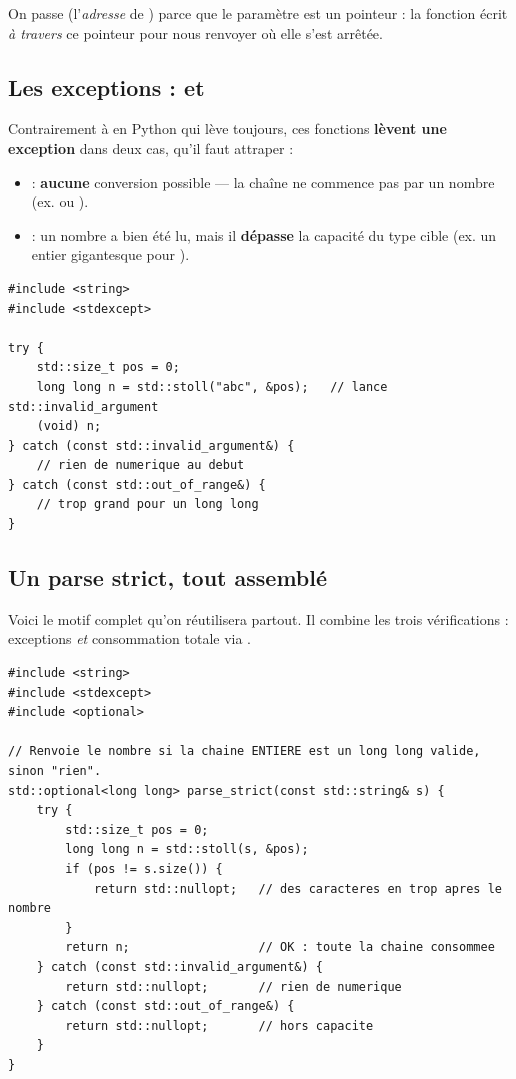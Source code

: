 \documentclass[11pt]{article}
\begin{document}
On passe  (l'\emph{adresse} de ) parce que le paramètre est
un pointeur  : la fonction écrit \emph{à travers} ce pointeur
pour nous renvoyer où elle s'est arrêtée.

\subsection*{Les exceptions :  et }

Contrairement à  en Python qui lève toujours, ces fonctions
\textbf{lèvent une exception} dans deux cas, qu'il faut attraper :

\begin{itemize}[noitemsep]
    \item {} : \textbf{aucune} conversion possible —
          la chaîne ne commence pas par un nombre (ex. 
          ou ).
    \item {} : un nombre a bien été lu, mais il
          \textbf{dépasse} la capacité du type cible (ex. un entier gigantesque
          pour ).
\end{itemize}

\begin{lstlisting}
#include <string>
#include <stdexcept>

try {
    std::size_t pos = 0;
    long long n = std::stoll("abc", &pos);   // lance std::invalid_argument
    (void) n;
} catch (const std::invalid_argument&) {
    // rien de numerique au debut
} catch (const std::out_of_range&) {
    // trop grand pour un long long
}
\end{lstlisting}

\subsection*{Un parse strict, tout assemblé}

Voici le motif complet qu'on réutilisera partout. Il combine les trois
vérifications : exceptions \emph{et} consommation totale via .

\begin{lstlisting}
#include <string>
#include <stdexcept>
#include <optional>

// Renvoie le nombre si la chaine ENTIERE est un long long valide, sinon "rien".
std::optional<long long> parse_strict(const std::string& s) {
    try {
        std::size_t pos = 0;
        long long n = std::stoll(s, &pos);
        if (pos != s.size()) {
            return std::nullopt;   // des caracteres en trop apres le nombre
        }
        return n;                  // OK : toute la chaine consommee
    } catch (const std::invalid_argument&) {
        return std::nullopt;       // rien de numerique
    } catch (const std::out_of_range&) {
        return std::nullopt;       // hors capacite
    }
}
\end{lstlisting}
\end{document}
